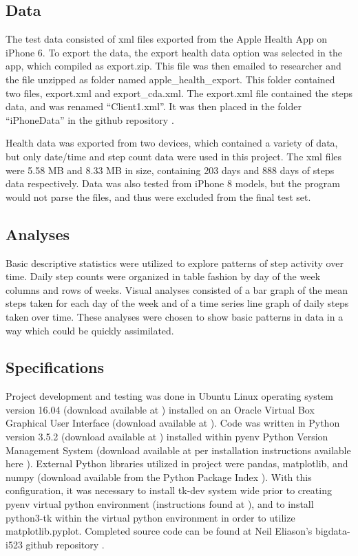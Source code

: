 \documentclass[sigconf]{acmart}
\begin{document}
\subsection{Data}

The test data consisted of xml files exported from the Apple Health App on iPhone 6. To export the data, the export health data option was selected in the app, which compiled as export.zip. This file was then emailed to researcher and the file unzipped as folder named apple\_health\_export. This folder contained two files, export.xml and export\_cda.xml. The export.xml file contained the steps data, and was renamed ``Client1.xml''. It was then placed in the folder ``iPhoneData'' in the github repository \cite{sourcecode}.

Health data was exported from two devices, which contained a variety of data, but only date/time and step count data were used in this project. The xml files were 5.58 MB and 8.33 MB in size, containing 203 days and 888 days of steps data respectively. Data was also tested from iPhone 8  models, but the program would not parse the files, and thus were excluded from the final test set.

\subsection{Analyses}

Basic descriptive statistics were utilized to explore patterns of step activity over time. Daily step counts were organized in table fashion by day of the week columns and rows of weeks. Visual analyses consisted of a bar graph of the mean steps taken for each day of the week and of a time series line graph of daily steps taken over time. These analyses were chosen to show basic patterns in data in a way which could be quickly assimilated. 

\subsection{Specifications}

Project development and testing was done in Ubuntu Linux operating system version 16.04 (download available at \cite{ubuntu}) installed on an Oracle Virtual Box Graphical User Interface (download available at \cite{virtualbox}). Code was written in Python version 3.5.2 (download available at \cite{python3.5.2}) installed within pyenv Python Version Management System (download available at \cite{pyenv} per installation instructions available here \cite{cloudmeshpyenv}). External Python libraries utilized in project were pandas, matplotlib, and numpy (download available from the Python Package Index \cite{pypi}). With this configuration, it was necessary to install tk-dev system wide prior to creating pyenv virtual python environment (instructions found at \cite{tk-dev}), and to install python3-tk within the virtual python environment in order to utilize matplotlib.pyplot. Completed source code can be found at Neil Eliason's bigdata-i523 github repository \cite{sourcecode}. 
\end{document}

